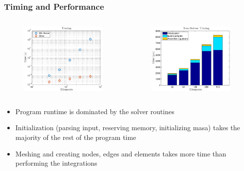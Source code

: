 \documentclass[unknownkeysallowed,12pt,mathserif]{beamer}
\begin{document}
\begin{frame}

\frametitle{Timing and Performance}

\begin{columns}[c]
\begin{column}{6.5cm}
\begin{figure}[!htbp] 
\includegraphics[width=6.5cm]{timing.eps}
\end{figure}
\end{column}
\begin{column}{6.5cm}
\begin{figure}[!htbp] 
\includegraphics[width=6.5cm]{other_timing.eps}
\end{figure}
\end{column}
\end{columns}
\begin{itemize}
\item \small Program runtime is dominated by the solver routines
\item \small Initialization (parsing input, reserving memory, initializing masa) takes the majority of the rest of the program time
\item \small Meshing and creating nodes, edges and elements takes more time than performing the integrations 
\end{itemize}

\end{frame}
\end{document}
